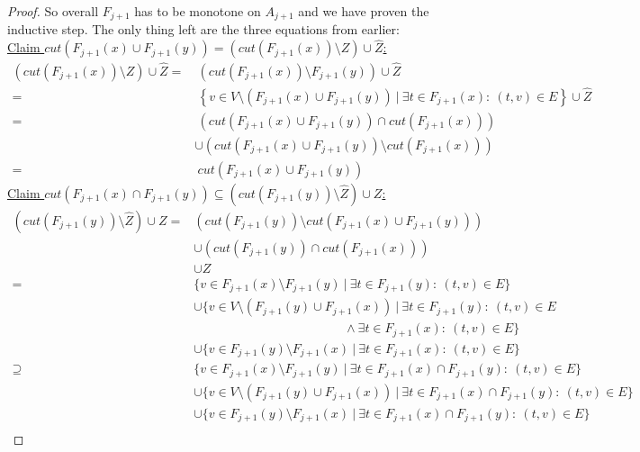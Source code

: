 \begin{proof}
    So overall $F_{j+1}$ has to be monotone on $A_{j+1}$ and we have proven the inductive step. The only thing left are the three equations from earlier:\\
\underline{Claim $cut(F_{j+1}(x) \cup F_{j+1}(y))=(cut(F_{j+1}(x))\setminus Z) \cup \hat{Z}$:}\\
\begin{align*}
    \left(cut(F_{j+1}(x))\setminus Z\right) \cup \hat{Z} =&\ \left(cut(F_{j+1}(x))\setminus F_{j+1}(y)\right) \cup \hat{Z} \\
    =&\ \left\{v \in  V\setminus \left( F_{j+1}(x)\cup F_{j+1}(y)\right) \ | \ \exists t \in F_{j+1}(x): \ (t,v)\in E  \right\} \cup \hat{Z} \\
    =&\ \left(cut\left(F_{j+1}(x) \cup F_{j+1}(y)\right) \cap cut\left(F_{j+1}(x)\right)\right) \\
    & \cup (cut(F_{j+1}(x) \cup F_{j+1}(y)) \setminus cut(F_{j+1}(x)))\\
    =&\ cut(F_{j+1}(x) \cup F_{j+1}(y))
\end{align*}
\underline{Claim $cut(F_{j+1}(x) \cap F_{j+1}(y))\subseteq (cut(F_{j+1}(y))\setminus \hat{Z}) \cup Z$:}\\
\begin{align*}
    (cut(F_{j+1}(y))\setminus \hat{Z}) \cup Z =& \left(cut(F_{j+1}(y))\setminus cut(F_{j+1}(x) \cup F_{j+1}(y))\right) \\
    &\cup \left(cut(F_{j+1}(y)) \cap cut(F_{j+1}(x))\right) \\
    &\cup Z \\
    =& \{v \in F_{j+1}(x)\setminus F_{j+1}(y) \ | \ \exists t \in F_{j+1}(y): \ (t,v)\in E\} \\
    &\cup \{v \in V\setminus (F_{j+1}(y) \cup F_{j+1}(x)) \ | \ \exists t \in F_{j+1}(y): \ (t,v)\in E \\
    &\hspace{5cm}                                        \wedge \exists t \in F_{j+1}(x): \ (t,v)\in E\}\\
    &\cup \{v \in F_{j+1}(y)\setminus F_{j+1}(x) \ | \ \exists t \in F_{j+1}(x): \ (t,v)\in E\} \\
    \supseteq& \{v \in F_{j+1}(x)\setminus F_{j+1}(y) \ | \ \exists t \in F_{j+1}(x)\cap F_{j+1}(y): \ (t,v)\in E\}\\
    &\cup \{v \in V\setminus (F_{j+1}(y) \cup F_{j+1}(x)) \ | \ \exists t \in F_{j+1}(x) \cap F_{j+1}(y): \ (t,v)\in E \}\\
    &\cup \{v \in F_{j+1}(y)\setminus F_{j+1}(x) \ | \ \exists t \in F_{j+1}(x) \cap F_{j+1}(y): \ (t,v)\in E\}\\

\end{align*}
\end{proof}
